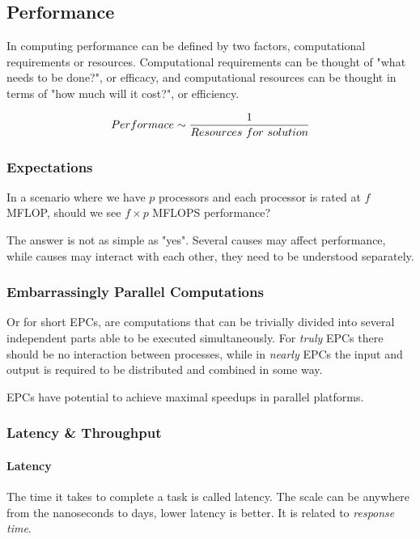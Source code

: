 \subsection{Performance}

In computing performance can be defined by two factors,
computational requirements or resources.
Computational requirements can be thought of "what needs to be done?", or efficacy,
and computational resources can be thought in terms of "how much will it cost?", or efficiency.

\begin{equation}
    \mathnormal{Performace} \sim \frac{1}{\mathnormal{Resources~for~solution}}
\end{equation}

\subsubsection{Expectations}
In a scenario where we have $p$ processors and each processor is rated at $f$ MFLOP, should we see $f \times p$ MFLOPS performance?

The answer is not as simple as "yes".
Several causes may affect performance, while causes may interact with each other,
they need to be understood separately.

\subsubsection{Embarrassingly Parallel Computations}
Or for short EPCs, are computations that can be trivially divided into several independent parts able to be executed simultaneously.
For \textit{truly} EPCs there should be no interaction between processes, while in \textit{nearly} EPCs the input and output is required to be distributed and combined in some way.

EPCs have potential to achieve maximal speedups in parallel platforms.

\subsubsection{Latency \& Throughput}

\paragraph{Latency}
The time it takes to complete a task is called latency.
The scale can be anywhere from the nanoseconds to days, lower latency is better.
It is related to \textit{response time}.

